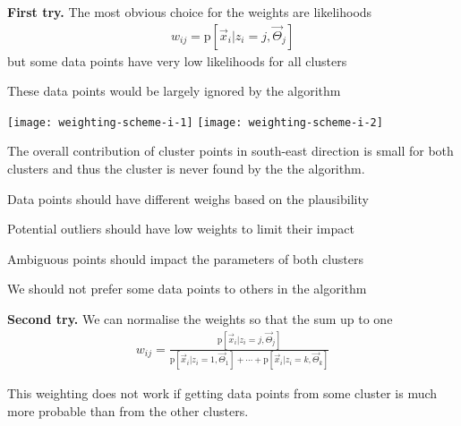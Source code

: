 \documentclass[landscape,footrule]{foils}
\newcommand{\pd}[1]{\mathrm{p}[#1]}
\begin{document}
\textbf{First try.}
The most obvious choice for the weights are likelihoods
\begin{align*}
w_{ij}=\pd{\vec{x}_i|z_i=j,\vec{\Theta}_j}
\end{align*} 
but some data points have very low likelihoods for all clusters
\begin{triangles}
\item These data points would be largely ignored by the algorithm 
\end{triangles} 


\begin{center}
\texttt{[image: weighting-scheme-i-1]}\hspace*{-2cm}
\texttt{[image: weighting-scheme-i-2]}
\end{center}
\vspace*{-2cm}

The overall contribution of cluster points in south-east direction is small for both clusters and thus the cluster is never found by the the algorithm.





Data points should have different weighs based on the plausibility 
\begin{triangles}
\item Potential outliers should have low weights to limit their impact
\item Ambiguous points should impact the parameters of both clusters 
\item We should not prefer some data points to others in the algorithm
\end{triangles} 
\vspace*{1cm}

\textbf{Second try.}
We can normalise the weights so that the sum up to one
\begin{align*}
w_{ij}=\frac{\pd{\vec{x}_i|z_i=j,\vec{\Theta}_j}}{\pd{\vec{x}_i|z_i=1,\vec{\Theta}_1}+\cdots+\pd{\vec{x}_i|z_i=k,\vec{\Theta}_k}}
\end{align*}

This weighting does not work if getting data points from some cluster is much more probable than from the other clusters.
\vspace*{-1cm} 



\end{document}
